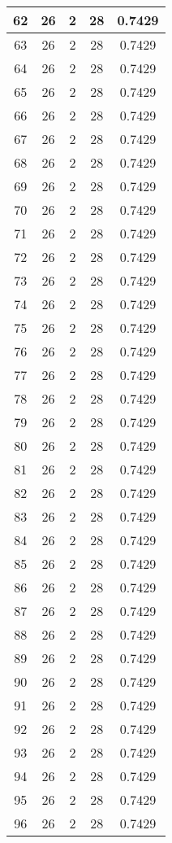 \documentclass[letterpaper, 12pt]{article}
\begin{document}
\begin{longtable}{|c|c|c|c|c|}
\hline
62 & 26 & 2 & 28 & 0.7429 \\
\hline
63 & 26 & 2 & 28 & 0.7429 \\
\hline
64 & 26 & 2 & 28 & 0.7429 \\
\hline
65 & 26 & 2 & 28 & 0.7429 \\
\hline
66 & 26 & 2 & 28 & 0.7429 \\
\hline
67 & 26 & 2 & 28 & 0.7429 \\
\hline
68 & 26 & 2 & 28 & 0.7429 \\
\hline
69 & 26 & 2 & 28 & 0.7429 \\
\hline
70 & 26 & 2 & 28 & 0.7429 \\
\hline
71 & 26 & 2 & 28 & 0.7429 \\
\hline
72 & 26 & 2 & 28 & 0.7429 \\
\hline
73 & 26 & 2 & 28 & 0.7429 \\
\hline
74 & 26 & 2 & 28 & 0.7429 \\
\hline
75 & 26 & 2 & 28 & 0.7429 \\
\hline
76 & 26 & 2 & 28 & 0.7429 \\
\hline
77 & 26 & 2 & 28 & 0.7429 \\
\hline
78 & 26 & 2 & 28 & 0.7429 \\
\hline
79 & 26 & 2 & 28 & 0.7429 \\
\hline
80 & 26 & 2 & 28 & 0.7429 \\
\hline
81 & 26 & 2 & 28 & 0.7429 \\
\hline
82 & 26 & 2 & 28 & 0.7429 \\
\hline
83 & 26 & 2 & 28 & 0.7429 \\
\hline
84 & 26 & 2 & 28 & 0.7429 \\
\hline
85 & 26 & 2 & 28 & 0.7429 \\
\hline
86 & 26 & 2 & 28 & 0.7429 \\
\hline
87 & 26 & 2 & 28 & 0.7429 \\
\hline
88 & 26 & 2 & 28 & 0.7429 \\
\hline
89 & 26 & 2 & 28 & 0.7429 \\
\hline
90 & 26 & 2 & 28 & 0.7429 \\
\hline
91 & 26 & 2 & 28 & 0.7429 \\
\hline
92 & 26 & 2 & 28 & 0.7429 \\
\hline
93 & 26 & 2 & 28 & 0.7429 \\
\hline
94 & 26 & 2 & 28 & 0.7429 \\
\hline
95 & 26 & 2 & 28 & 0.7429 \\
\hline
96 & 26 & 2 & 28 & 0.7429 \\

\end{longtable}
\end{document}
